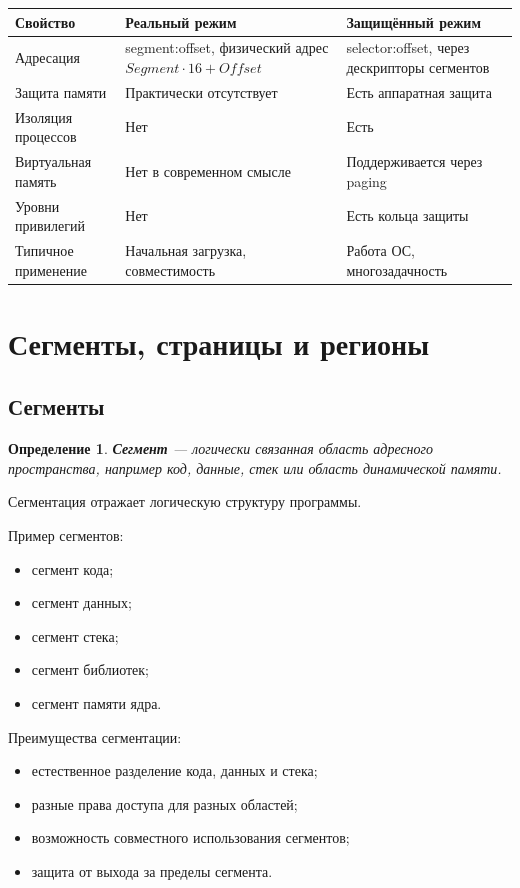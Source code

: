 \documentclass[a4paper,12pt]{article}
\newtheorem{definition}{Определение}
\begin{document}
\begin{center}
\begin{tabular}{|p{4cm}|p{5cm}|p{5cm}|}
\hline
\textbf{Свойство} & \textbf{Реальный режим} & \textbf{Защищённый режим} \\
\hline
Адресация & segment:offset, физический адрес $Segment \cdot 16 + Offset$ & selector:offset, через дескрипторы сегментов \\
\hline
Защита памяти & Практически отсутствует & Есть аппаратная защита \\
\hline
Изоляция процессов & Нет & Есть \\
\hline
Виртуальная память & Нет в современном смысле & Поддерживается через paging \\
\hline
Уровни привилегий & Нет & Есть кольца защиты \\
\hline
Типичное применение & Начальная загрузка, совместимость & Работа ОС, многозадачность \\
\hline
\end{tabular}
\end{center}

\section{Сегменты, страницы и регионы}

\subsection{Сегменты}

\begin{definition}
\textbf{Сегмент} --- логически связанная область адресного пространства, например код, данные, стек или область динамической памяти.
\end{definition}

Сегментация отражает логическую структуру программы.

Пример сегментов:

\begin{itemize}
    \item сегмент кода;
    \item сегмент данных;
    \item сегмент стека;
    \item сегмент библиотек;
    \item сегмент памяти ядра.
\end{itemize}

Преимущества сегментации:

\begin{itemize}
    \item естественное разделение кода, данных и стека;
    \item разные права доступа для разных областей;
    \item возможность совместного использования сегментов;
    \item защита от выхода за пределы сегмента.
\end{itemize}
\end{document}
